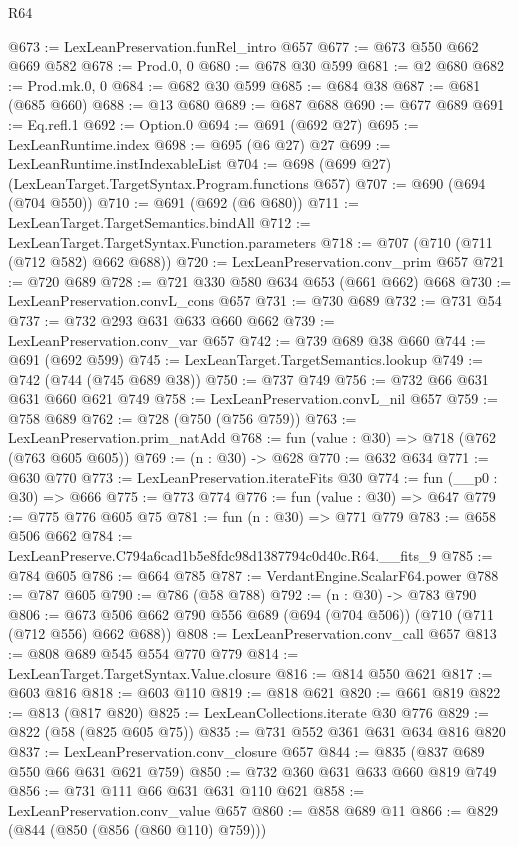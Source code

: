 \begin{lexlean}{R64}
\begin{coremodule}
@673 := LexLeanPreservation.funRel_intro @657
@677 := @673 @550 @662 @669 @582
@678 := Prod.{0, 0}
@680 := @678 @30 @599
@681 := @2 @680
@682 := Prod.mk.{0, 0}
@684 := @682 @30 @599
@685 := @684 @38
@687 := @681 (@685 @660)
@688 := @13 @680
@689 := @687 @688
@690 := @677 @689
@691 := Eq.refl.{1}
@692 := Option.{0}
@694 := @691 (@692 @27)
@695 := LexLeanRuntime.index
@698 := @695 (@6 @27) @27
@699 := LexLeanRuntime.instIndexableList
@704 := @698 (@699 @27) (LexLeanTarget.TargetSyntax.Program.functions @657)
@707 := @690 (@694 (@704 @550))
@710 := @691 (@692 (@6 @680))
@711 := LexLeanTarget.TargetSemantics.bindAll
@712 := LexLeanTarget.TargetSyntax.Function.parameters
@718 := @707 (@710 (@711 (@712 @582) @662 @688))
@720 := LexLeanPreservation.conv_prim @657
@721 := @720 @689
@728 := @721 @330 @580 @634 @653 (@661 @662) @668
@730 := LexLeanPreservation.convL_cons @657
@731 := @730 @689
@732 := @731 @54
@737 := @732 @293 @631 @633 @660 @662
@739 := LexLeanPreservation.conv_var @657
@742 := @739 @689 @38 @660
@744 := @691 (@692 @599)
@745 := LexLeanTarget.TargetSemantics.lookup
@749 := @742 (@744 (@745 @689 @38))
@750 := @737 @749
@756 := @732 @66 @631 @631 @660 @621 @749
@758 := LexLeanPreservation.convL_nil @657
@759 := @758 @689
@762 := @728 (@750 (@756 @759))
@763 := LexLeanPreservation.prim_natAdd
@768 := fun (value : @30) => @718 (@762 (@763 @605 @605))
@769 := (n : @30) -> @628
@770 := @632 @634
@771 := @630 @770
@773 := LexLeanPreservation.iterateFits @30
@774 := fun (__p0 : @30) => @666
@775 := @773 @774
@776 := fun (value : @30) => @647
@779 := @775 @776 @605 @75
@781 := fun (n : @30) => @771 @779
@783 := @658 @506 @662
@784 := LexLeanPreserve.C794a6cad1b5e8fdc98d1387794c0d40c.R64.__fits_9
@785 := @784 @605
@786 := @664 @785
@787 := VerdantEngine.ScalarF64.power
@788 := @787 @605
@790 := @786 (@58 @788)
@792 := (n : @30) -> @783 @790
@806 := @673 @506 @662 @790 @556 @689 (@694 (@704 @506)) (@710 (@711 (@712 @556) @662 @688))
@808 := LexLeanPreservation.conv_call @657
@813 := @808 @689 @545 @554 @770 @779
@814 := LexLeanTarget.TargetSyntax.Value.closure
@816 := @814 @550 @621
@817 := @603 @816
@818 := @603 @110
@819 := @818 @621
@820 := @661 @819
@822 := @813 (@817 @820)
@825 := LexLeanCollections.iterate @30 @776
@829 := @822 (@58 (@825 @605 @75))
@835 := @731 @552 @361 @631 @634 @816 @820
@837 := LexLeanPreservation.conv_closure @657
@844 := @835 (@837 @689 @550 @66 @631 @621 @759)
@850 := @732 @360 @631 @633 @660 @819 @749
@856 := @731 @111 @66 @631 @631 @110 @621
@858 := LexLeanPreservation.conv_value @657
@860 := @858 @689 @11
@866 := @829 (@844 (@850 (@856 (@860 @110) @759)))

\end{coremodule}
\end{lexlean}
